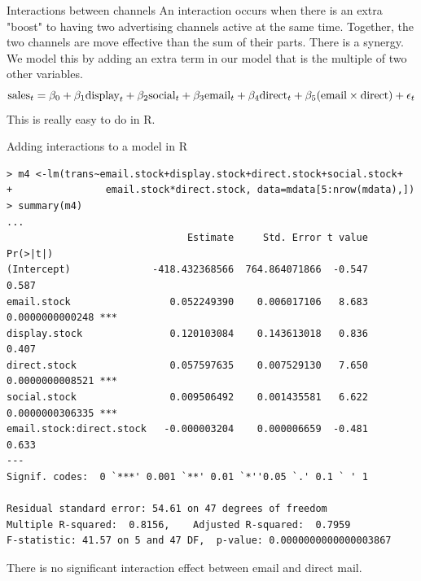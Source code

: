 \documentclass[10pt, aspectratio=169]{beamer}
\begin{document}
\begin{frame}{Interactions between channels}
An interaction occurs when there is an extra "boost" to having two advertising channels active at the same time. Together, the two channels are move effective than the sum of their parts. There is a synergy. \\
\bigskip \pause
We model this by adding an extra term in our model that is the multiple of two other variables. 
\begin{equation*}
\textnormal{sales}_t = \beta_0 + \beta_1 \textnormal{display}_t + \beta_2 \textnormal{social}_t + \beta_3 \textnormal{email}_t + \beta_4 \textnormal{direct}_t + \beta_5 (\textnormal{email} \times \textnormal{direct}) + \epsilon_t
\end{equation*}
This is really easy to do in R. 
\end{frame}

\begin{frame}[fragile]{Adding interactions to a model in R}
\footnotesize
\begin{lstlisting}
> m4 <-lm(trans~email.stock+display.stock+direct.stock+social.stock+
+                email.stock*direct.stock, data=mdata[5:nrow(mdata),]) 
> summary(m4)
...
                               Estimate     Std. Error t value        Pr(>|t|)    
(Intercept)              -418.432368566  764.864071866  -0.547           0.587    
email.stock                 0.052249390    0.006017106   8.683 0.0000000000248 ***
display.stock               0.120103084    0.143613018   0.836           0.407    
direct.stock                0.057597635    0.007529130   7.650 0.0000000008521 ***
social.stock                0.009506492    0.001435581   6.622 0.0000000306335 ***
email.stock:direct.stock   -0.000003204    0.000006659  -0.481           0.633    
---
Signif. codes:  0 `***' 0.001 `**' 0.01 `*''0.05 `.' 0.1 ` ' 1

Residual standard error: 54.61 on 47 degrees of freedom
Multiple R-squared:  0.8156,	Adjusted R-squared:  0.7959 
F-statistic: 41.57 on 5 and 47 DF,  p-value: 0.0000000000000003867
\end{lstlisting}
\alert{There is no significant interaction effect between email and direct mail.}
\end{frame}
\end{document}
